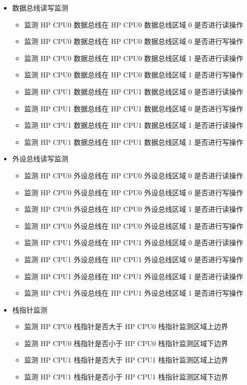 \documentclass[main\_\_CN.tex]{subfiles}
\begin{document}
\begin{itemize}
    \item 数据总线读写监测
        \begin{itemize}
            \item 监测 HP CPU0 数据总线在 HP CPU0 数据总线区域 0 是否进行读操作
            \item 监测 HP CPU0 数据总线在 HP CPU0 数据总线区域 0 是否进行写操作
            \item 监测 HP CPU0 数据总线在 HP CPU0 数据总线区域 1 是否进行读操作
            \item 监测 HP CPU0 数据总线在 HP CPU0 数据总线区域 1 是否进行写操作
            \item 监测 HP CPU1 数据总线在 HP CPU1 数据总线区域 0 是否进行读操作
            \item 监测 HP CPU1 数据总线在 HP CPU1 数据总线区域 0 是否进行写操作
            \item 监测 HP CPU1 数据总线在 HP CPU1 数据总线区域 1 是否进行读操作
            \item 监测 HP CPU1 数据总线在 HP CPU1 数据总线区域 1 是否进行写操作
        \end{itemize}
    \item 外设总线读写监测
        \begin{itemize}
            \item 监测 HP CPU0 外设总线在 HP CPU0 外设总线区域 0 是否进行读操作
            \item 监测 HP CPU0 外设总线在 HP CPU0 外设总线区域 0 是否进行写操作
            \item 监测 HP CPU0 外设总线在 HP CPU0 外设总线区域 1 是否进行读操作
            \item 监测 HP CPU0 外设总线在 HP CPU0 外设总线区域 1 是否进行写操作
            \item 监测 HP CPU1 外设总线在 HP CPU1 外设总线区域 0 是否进行读操作
            \item 监测 HP CPU1 外设总线在 HP CPU1 外设总线区域 0 是否进行写操作
            \item 监测 HP CPU1 外设总线在 HP CPU1 外设总线区域 1 是否进行读操作
            \item 监测 HP CPU1 外设总线在 HP CPU1 外设总线区域 1 是否进行写操作
        \end{itemize}
    \item 栈指针监测
        \begin{itemize}
            \item 监测 HP CPU0 栈指针是否大于 HP CPU0 栈指针监测区域上边界
            \item 监测 HP CPU0 栈指针是否小于 HP CPU0 栈指针监测区域下边界
            \item 监测 HP CPU1 栈指针是否大于 HP CPU1 栈指针监测区域上边界
            \item 监测 HP CPU1 栈指针是否小于 HP CPU1 栈指针监测区域下边界
        \end{itemize}
\end{itemize}
\end{document}
